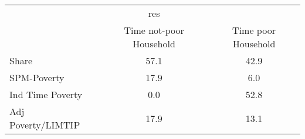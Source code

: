 \begin{tabular}{l*{2}{c}}
\hline\hline
            &         res&            \\
            &Time not-poor Household&Time poor Household\\
\hline
Share       &        57.1&        42.9\\
SPM-Poverty &        17.9&         6.0\\
Ind Time Poverty&         0.0&        52.8\\
Adj Poverty/LIMTIP&        17.9&        13.1\\
\hline\hline
\end{tabular}
